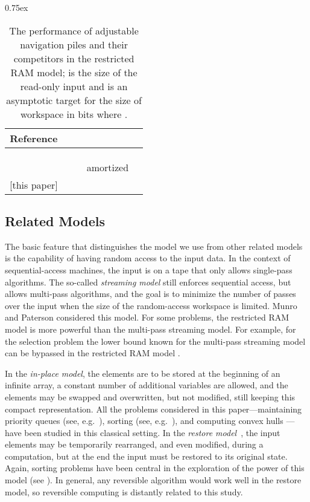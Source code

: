 \documentclass[final,onetabnum,onefignum,onethmnum]{siamltex}
\newcommand{\Minimum}{\mbox{}}
\newcommand{\Insert}{\mbox{}}
\newcommand{\Extract}{\mbox{}}
\newcommand{\ylatyhjaa}{\mbox{}}
\begin{document}
\begin{table}[tb!]
\caption{The performance of adjustable navigation piles and their
  competitors in the restricted RAM model;  is
  the size of the read-only input and  is an asymptotic target for
  the size of workspace in bits where .}
\label{table:queues}
\begin{center}
\begin{small}
\tabcolsep0.75ex
\begin{tabular}{|c|c|c|c|c|}
\hline
\textbf{Reference}\ylatyhjaa & \textbf{Space\strut} & \Minimum{} &
\Insert{} & \Extract{}\\ 
\hline
\cite{CMP88}\ylatyhjaa{} &  & 
 &  & \\
\cite{KV03} &  & 
 &  & \\
\cite{Fre87} &  &  &  & \\
\cite{PR98} &  &
 &  amortized & \\
{}[this paper] &  &
 &  & \\
\hline
\end{tabular}
\end{small}
\end{center}
\end{table}


\subsection{Related Models} The basic feature that distinguishes the
model we use from other related models is the capability of having
random access to the input data. In the context of sequential-access
machines, the input is on a tape that only allows single-pass
algorithms. The so-called \emph{streaming model} still enforces
sequential access, but allows multi-pass algorithms, and the goal is
to minimize the number of passes over the input when the size of the
random-access workspace is limited. Munro and Paterson \cite{MP80}
considered this model. For some problems, the restricted RAM model is
more powerful than the multi-pass streaming model. For example, for
the selection problem the lower bound known for the multi-pass
streaming model \cite{Cha10} can be bypassed in the restricted RAM
model \cite{EJKS14}.

In the \emph{in-place model}, the elements are to be stored at the
beginning of an infinite array, a constant number of additional
variables are allowed, and the elements may be swapped and
overwritten, but not modified, still keeping this compact
representation.  All the problems considered in this
paper---maintaining priority queues (see,
e.g.~\cite{CMP88,EEK15,Wil64}), sorting (see,
e.g.~\cite{EEK15,KPT96,Wil64}), and computing convex hulls
\cite{BIKMMT04}---have been studied in this classical setting.  In the
\emph{restore model}~\cite{CMR14}, the input elements may be
temporarily rearranged, and even modified, during a computation, but
at the end the input must be restored to its original state. Again,
sorting problems have been central in the exploration of the power of
this model (see \cite{CMR14,KP94}). In general, any reversible
algorithm would work well in the restore model, so reversible
computing is distantly related to this study.
\end{document}

